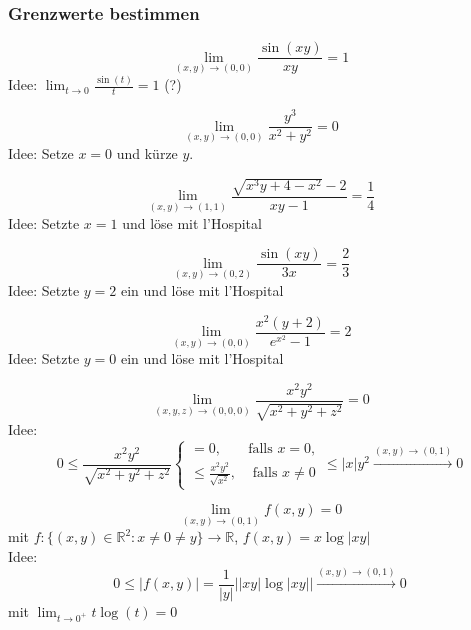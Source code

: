 \subsubsection{Grenzwerte bestimmen}
\begin{displaymath}
  \lim_{(x,y) \to (0,0)} \frac{\sin(xy)}{xy} = 1
\end{displaymath}
Idee: $\lim_{t \to 0} \frac{\sin(t)}{t} = 1$ (?)

\begin{displaymath}
  \lim_{(x,y) \to (0,0)} \frac{y^3}{x^2 + y^2} = 0
\end{displaymath}
Idee: Setze $x = 0$ und kürze $y$.

\begin{displaymath}
  \lim_{(x,y) \to (1,1)} \frac{\sqrt{x^3y + 4 - x^2} - 2}{xy - 1} = \frac{1}{4}
\end{displaymath}
Idee: Setzte $x = 1$ und löse mit l'Hospital

\begin{displaymath}
  \lim_{(x,y) \to (0,2)} \frac{\sin(xy)}{3x} = \frac{2}{3}
\end{displaymath}
Idee: Setzte $y = 2$ ein und löse mit l'Hospital

\begin{displaymath}
  \lim_{(x,y) \to (0,0)} \frac{x^2(y + 2)}{e^{x^2} - 1} = 2
\end{displaymath}
Idee: Setzte $y = 0$ ein und löse mit l'Hospital

\begin{displaymath}
  \lim_{(x,y,z) \to (0,0,0)} \frac{x^2 y^2}{\sqrt{x^2 + y^2 + z^2}} = 0
\end{displaymath}
Idee:
\begin{displaymath}
  0 \leq \frac{x^2 y^2}{\sqrt{x^2 + y^2 + z^2}}
  \begin{cases}
    = 0,& \text{falls } x = 0,\\
    \leq \frac{x^2 y^2}{\sqrt{x^2}},& \text{ falls } x \neq 0
  \end{cases}
  \leq |x|y^2 \xrightarrow{(x,y) \to (0,1)} 0
\end{displaymath}

\begin{displaymath}
  \lim_{(x,y) \to (0,1)} f(x,y) = 0
\end{displaymath}
mit $f : \{(x,y) \in \mathbb{R}^2: x \neq 0 \neq y\} \to \mathbb{R}$, $f(x,y) = x \log |xy|$\\
Idee:
\begin{displaymath}
  0 \leq |f(x,y)| = \frac{1}{|y|} ||xy| \log |xy|| \xrightarrow{(x,y) \to (0,1)} 0
\end{displaymath}
mit $\lim_{t \to 0^+} t\log(t) = 0$

